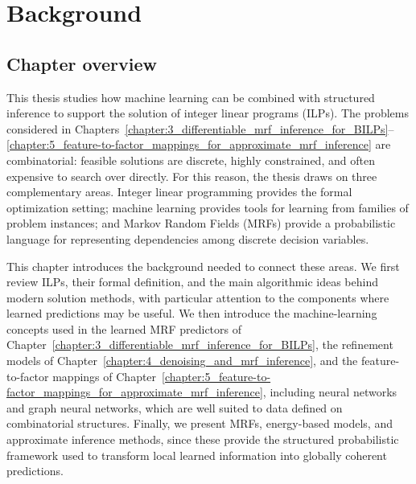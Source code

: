 \chapter{Background}\label{chap1:background}

\section{Chapter overview}

This thesis studies how machine learning can be combined with structured inference to support the solution of integer linear programs (ILPs). The problems considered in Chapters~\ref{chapter:3_differentiable_mrf_inference_for_BILPs}--\ref{chapter:5_feature-to-factor_mappings_for_approximate_mrf_inference} are combinatorial: feasible solutions are discrete, highly constrained, and often expensive to search over directly. For this reason, the thesis draws on three complementary areas. Integer linear programming provides the formal optimization setting; machine learning provides tools for learning from families of problem instances; and Markov Random Fields (MRFs) provide a probabilistic language for representing dependencies among discrete decision variables.

This chapter introduces the background needed to connect these areas. We first review ILPs, their formal definition, and the main algorithmic ideas behind modern solution methods, with particular attention to the components where learned predictions may be useful. We then introduce the machine-learning concepts used in the learned MRF predictors of Chapter~\ref{chapter:3_differentiable_mrf_inference_for_BILPs}, the refinement models of Chapter~\ref{chapter:4_denoising_and_mrf_inference}, and the feature-to-factor mappings of Chapter~\ref{chapter:5_feature-to-factor_mappings_for_approximate_mrf_inference}, including neural networks and graph neural networks, which are well suited to data defined on combinatorial structures. Finally, we present MRFs, energy-based models, and approximate inference methods, since these provide the structured probabilistic framework used to transform local learned information into globally coherent predictions.






